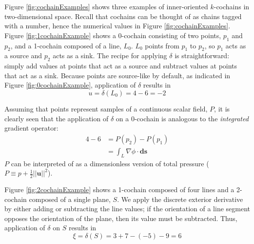 Figure \ref{fig:cochainExamples} shows three examples of inner-oriented $k$-cochains in two-dimensional space. Recall that cochains can be thought of as chains tagged with a number, hence the numerical values in Figure \ref{fig:cochainExamples}. Figure \ref{fig:1cochainExample} shows a 0-cochain consisting of two points, $p_1$ and $p_2$, and a 1-cochain composed of a line, $L_0$. $L_0$ points from $p_1$ to $p_2$, so $p_1$ acts as a source and $p_2$ acts as a sink. The recipe for applying $\delta$ is straightforward: simply add values at points that act as a source and subtract values at points that act as a sink. Because points are source-like by default, as indicated in Figure \ref{fig:0cochainExample}, application of $\delta$ results in
\begin{equation}
    u = \delta(L_0) = 4 - 6 = -2
\end{equation}

Assuming that points represent samples of a continuous scalar field, $P$, it is clearly seen that the application of $\delta$ on a 0-cochain is analogous to the \emph{integrated} gradient operator:
\begin{equation}
    \begin{split}
        4 - 6 &= P(p_2) - P(p_1) \\
        &= \int_{L} \nabla \phi \cdot \mathbf{ds}
    \end{split}
\end{equation}
$P$ can be interpreted of as a dimensionless version of total pressure ($P \equiv p + \frac{1}{2}||\mathbf{u}||^2$).

Figure \ref{fig:2cochainExample} shows a 1-cochain composed of four lines and a 2-cochain composed of a single plane, $S$. We apply the discrete exterior derivative by either adding or subtracting the line values; if the orientation of a line segment opposes the orientation of the plane, then its value must be subtracted. Thus, application of $\delta$ on $S$ results in\begin{equation}
    \xi = \delta(S) = 3 + 7 - (-5) - 9 = 6
\end{equation}

